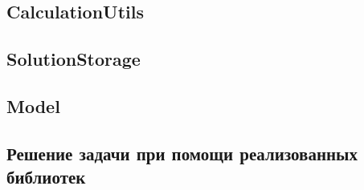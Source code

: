 \documentclass[12pt, a4paper]{article}
\begin{document}
	\subsection{CalculationUtils}
	
	
	\subsection{SolutionStorage}
	
	
	\subsection{Model}
	
	
	
	\subsection{Решение задачи при помощи реализованных библиотек}
	
	
	
\end{document}

